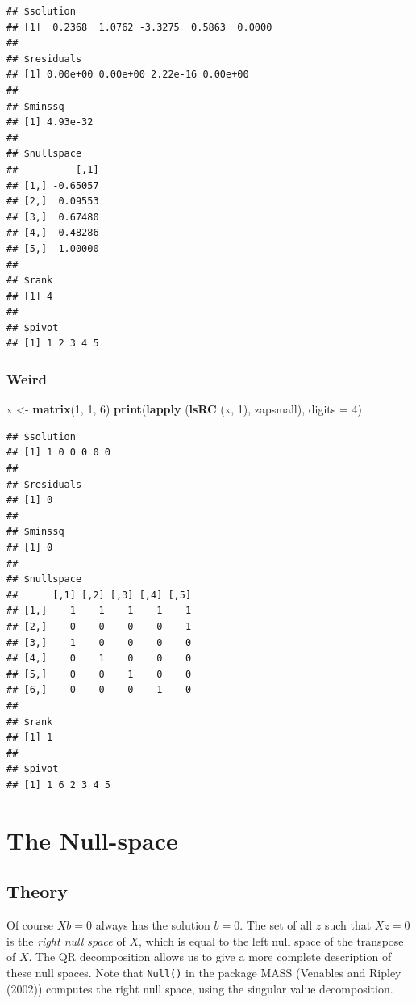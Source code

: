 \documentclass[12pt,]{article}
\newenvironment{Shaded}{\begin{snugshade}}{\end{snugshade}}
\newcommand{\KeywordTok}[1]{\textcolor[rgb]{0.13,0.29,0.53}{\textbf{#1}}}
\newcommand{\DataTypeTok}[1]{\textcolor[rgb]{0.13,0.29,0.53}{#1}}
\newcommand{\DecValTok}[1]{\textcolor[rgb]{0.00,0.00,0.81}{#1}}
\newcommand{\StringTok}[1]{\textcolor[rgb]{0.31,0.60,0.02}{#1}}
\newcommand{\NormalTok}[1]{#1}
\begin{document}
\begin{verbatim}
## $solution
## [1]  0.2368  1.0762 -3.3275  0.5863  0.0000
## 
## $residuals
## [1] 0.00e+00 0.00e+00 2.22e-16 0.00e+00
## 
## $minssq
## [1] 4.93e-32
## 
## $nullspace
##          [,1]
## [1,] -0.65057
## [2,]  0.09553
## [3,]  0.67480
## [4,]  0.48286
## [5,]  1.00000
## 
## $rank
## [1] 4
## 
## $pivot
## [1] 1 2 3 4 5
\end{verbatim}

\subsubsection{Weird}\label{weird-1}

\begin{Shaded}
\begin{Highlighting}[]
\NormalTok{x <-}\StringTok{ }\KeywordTok{matrix}\NormalTok{(}\DecValTok{1}\NormalTok{, }\DecValTok{1}\NormalTok{, }\DecValTok{6}\NormalTok{)}
\KeywordTok{print}\NormalTok{(}\KeywordTok{lapply}\NormalTok{ (}\KeywordTok{lsRC}\NormalTok{ (x, }\DecValTok{1}\NormalTok{), zapsmall), }\DataTypeTok{digits =} \DecValTok{4}\NormalTok{)}
\end{Highlighting}
\end{Shaded}

\begin{verbatim}
## $solution
## [1] 1 0 0 0 0 0
## 
## $residuals
## [1] 0
## 
## $minssq
## [1] 0
## 
## $nullspace
##      [,1] [,2] [,3] [,4] [,5]
## [1,]   -1   -1   -1   -1   -1
## [2,]    0    0    0    0    1
## [3,]    1    0    0    0    0
## [4,]    0    1    0    0    0
## [5,]    0    0    1    0    0
## [6,]    0    0    0    1    0
## 
## $rank
## [1] 1
## 
## $pivot
## [1] 1 6 2 3 4 5
\end{verbatim}

\section{The Null-space}\label{the-null-space}

\subsection{Theory}\label{theory-2}

Of course \(Xb=0\) always has the solution \(b=0\). The set of all \(z\)
such that \(Xz=0\) is the \emph{right null space} of \(X\), which is
equal to the left null space of the transpose of \(X\). The QR
decomposition allows us to give a more complete description of these
null spaces. Note that \texttt{Null()} in the package MASS (Venables and
Ripley (2002)) computes the right null space, using the singular value
decomposition.
\end{document}
